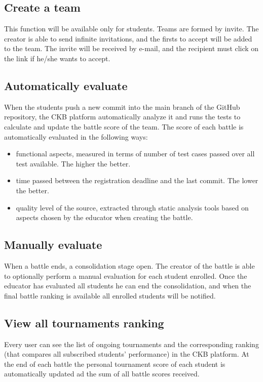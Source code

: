 \subsection{Create a team}
This function will be available only for students. \newline
Teams are formed by invite. The creator is able to send infinite invitations, and the firsts to accept will be added to the team.  \newline
The invite will be received by e-mail, and the recipient must click on the link if he/she wants to accept. 

\subsection{Automatically evaluate}
When the students push a new commit into the main branch of the GitHub repository, the CKB platform automatically analyze it and runs the tests to calculate and update the battle score of the team.\newline
The score of each battle is automatically evaluated in the following ways:
\begin{itemize}
        \item functional aspects, measured in terms of number of test cases passed over all test available. The higher the better.
        \item time passed between the registration deadline and the last commit. The lower the better.
        \item quality level of the source, extracted through static analysis tools based on aspects chosen by the educator when creating the battle. 
\end{itemize}

\subsection{Manually evaluate}
When a battle ends, a consolidation stage open. The creator of the battle is able to optionally perform a manual evaluation for each student enrolled.
Once the educator has evaluated all students he can end the consolidation, and when the final battle ranking is available all enrolled students will be notified.

\subsection{View all tournaments ranking}
Every user can see the list of ongoing tournaments and the corresponding ranking (that compares all subscribed students' performance) in the CKB platform.
At the end of each battle the personal tournament score of each student is automatically updated ad the sum of all battle scores received. 

